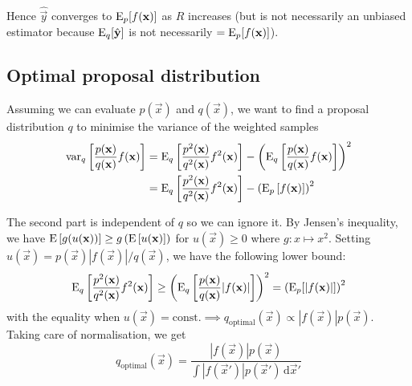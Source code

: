     Hence $\hat{\vec y}$ converges to $\operatorname{\mathrm{E}}_p[f(\boldsymbol{\mathbf{x}})]$ as $R$ increases (but is not necessarily an unbiased estimator because $\operatorname{\mathrm{E}}_q[\hat{\boldsymbol{\mathbf{y}}}]$ is not necessarily $= \operatorname{\mathrm{E}}_p[f(\boldsymbol{\mathbf{x}})]$).

\subsection{Optimal proposal distribution}
    Assuming we can evaluate $p(\vec x)$ and $q(\vec x)$, we want to find a proposal distribution $q$ to minimise the variance of the weighted samples
    \begin{align}
        \operatorname{\mathrm{var}}_q\left[\frac{p(\boldsymbol{\mathbf{x}})}{q(\boldsymbol{\mathbf{x}})} f(\boldsymbol{\mathbf{x}})\right]    &= \operatorname{\mathrm{E}}_q\left[\frac{p^2(\boldsymbol{\mathbf{x}})}{q^2(\boldsymbol{\mathbf{x}})} f^2(\boldsymbol{\mathbf{x}})\right] - \left( \operatorname{\mathrm{E}}_q\left[\frac{p(\boldsymbol{\mathbf{x}})}{q(\boldsymbol{\mathbf{x}})} f(\boldsymbol{\mathbf{x}})\right] \right)^2 \\
                                                                    &= \operatorname{\mathrm{E}}_q\left[\frac{p^2(\boldsymbol{\mathbf{x}})}{q^2(\boldsymbol{\mathbf{x}})} f^2(\boldsymbol{\mathbf{x}})\right] - \left( \operatorname{\mathrm{E}}_p\left[f(\boldsymbol{\mathbf{x}})\right] \right)^2
    \end{align}

    The second part is independent of $q$ so we can ignore it. By Jensen's inequality, we have $\operatorname{\mathrm{E}}\left[g(u(\boldsymbol{\mathbf{x}}))\right] \geq g\left(\operatorname{\mathrm{E}}\left[u(\boldsymbol{\mathbf{x}}\right)]\right)$ for $u(\vec x) \geq 0$ where $g: x \mapsto x^2$. Setting $u(\vec x) = p(\vec x)|f(\vec x)| / q(\vec x)$, we have the following lower bound:
    \begin{equation}
        \operatorname{\mathrm{E}}_q\left[\frac{p^2(\boldsymbol{\mathbf{x}})}{q^2(\boldsymbol{\mathbf{x}})} f^2(\boldsymbol{\mathbf{x}})\right] \geq \left( \operatorname{\mathrm{E}}_q\left[\frac{p(\boldsymbol{\mathbf{x}})}{q(\boldsymbol{\mathbf{x}})} |f(\boldsymbol{\mathbf{x}})|\right] \right)^2 = \left( \operatorname{\mathrm{E}}_p[|f(\boldsymbol{\mathbf{x}})|] \right)^2
    \end{equation}
    with the equality when $u(\vec x) = \text{const.} \implies q_{\text{optimal}}(\vec x) \propto |f(\vec x)|p(\vec x)$. Taking care of normalisation, we get
    \begin{equation}
        q_{\text{optimal}}(\vec x) = \frac{|f(\vec x)|p(\vec x)}{\int |f(\vec x')|p(\vec x') \,\mathrm d \vec x'}
    \end{equation}